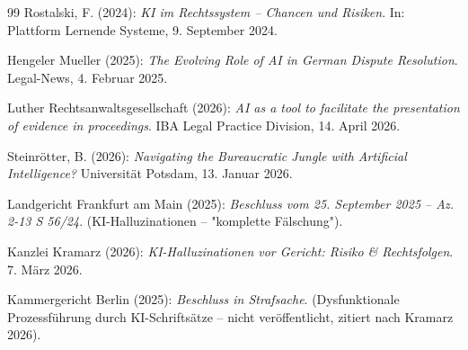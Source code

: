 \documentclass[12pt,a4paper]{article}
\begin{document}
\begin{thebibliography}{99}
		 Rostalski, F. (2024): \emph{KI im Rechtssystem – Chancen und Risiken}. In: Plattform Lernende Systeme, 9. September 2024.
		
		 Hengeler Mueller (2025): \emph{The Evolving Role of AI in German Dispute Resolution}. Legal-News, 4. Februar 2025.
		
		 Luther Rechtsanwaltsgesellschaft (2026): \emph{AI as a tool to facilitate the presentation of evidence in proceedings}. IBA Legal Practice Division, 14. April 2026.
		
		 Steinrötter, B. (2026): \emph{Navigating the Bureaucratic Jungle with Artificial Intelligence?} Universität Potsdam, 13. Januar 2026.
		
		 Landgericht Frankfurt am Main (2025): \emph{Beschluss vom 25. September 2025 – Az. 2-13 S 56/24}. (KI-Halluzinationen – "komplette Fälschung").
		
		 Kanzlei Kramarz (2026): \emph{KI-Halluzinationen vor Gericht: Risiko \& Rechtsfolgen}. 7. März 2026.
		
		 Kammergericht Berlin (2025): \emph{Beschluss in Strafsache}. (Dysfunktionale Prozessführung durch KI-Schriftsätze – nicht veröffentlicht, zitiert nach Kramarz 2026).
		
	\end{thebibliography}
	
\end{document}
